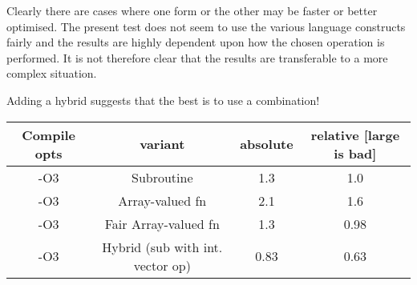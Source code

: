 \documentclass[a4paper,twoside,12pt]{article}
\begin{document}
Clearly there are cases where one form or the other may be faster or
better optimised.  The present test does not seem to use the various
language constructs fairly and the results are highly dependent upon 
how the chosen operation is performed.  It is not therefore clear that
the results are transferable to a more complex situation.

Adding a hybrid suggests that the best is to use a combination!

\begin{tabular}{cccc}
   Compile opts     &       variant       &     absolute & relative [large is bad] \\
\hline
   -O3     &  Subroutine            &    1.3    &   1.0 \\
   -O3     &  Array-valued fn       &    2.1    &   1.6 \\
   -O3     &  Fair Array-valued fn  &    1.3    &   0.98 \\
   -O3     &  Hybrid (sub with int. vector op) &    0.83    &   0.63 \\
\hline
\end{tabular}

\label{lastpage}
\end{document}

